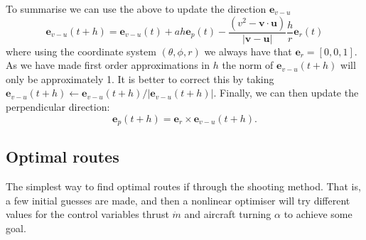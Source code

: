 \documentclass{article}
\renewcommand{\vec}[1]{\boldsymbol{#1}}
\begin{document}
 
To summarise we can use the above to update the direction $\vec e_{v-u}$
\begin{equation}
    \vec e_{v-u}(t+h) = \vec e_{v-u}(t) + a h \vec e_p(t) - \frac{(v^2-\vec v \cdot \vec{u})}{|\vec v-\vec u| } \frac{ h}{r} \vec e_r(t)
\end{equation}
where using the coordinate system $(\theta,\phi,r)$ we always have that $\vec e_r = [0,0,1]$. As we have made first order approximations in $h$ the norm of $\vec e_{v-u}(t+h)$ will only be approximately 1. It is better to correct this by taking $ \vec e_{v-u}(t+h)  \leftarrow  \vec e_{v-u}(t+h) / | \vec e_{v-u}(t+h) |$. Finally, we can then update the perpendicular direction:
\begin{equation}
    \vec e_p(t+h) = \vec e_r \times \vec e_{v-u}(t+h).
\end{equation}



\subsection{Optimal routes}
\label{sec:optimal-routes}

The simplest way to find optimal routes if through the shooting method. That is, a few initial guesses are made, and then a nonlinear optimiser will try different values for the control variables thrust $\dot m$ and aircraft turning $\alpha$ to achieve some goal. 
\end{document}
